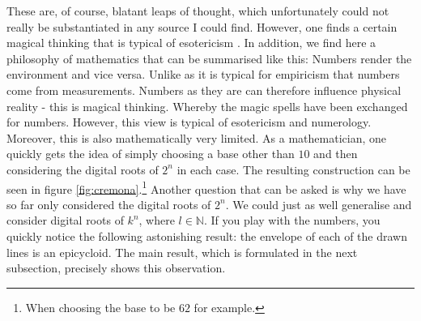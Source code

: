 \documentclass{article}
\newcommand{\N}{\mathbb{N}}
\begin{document}
These are, of course, blatant leaps of thought, which unfortunately could not really be substantiated in any source I could find. However, one finds a certain 
magical thinking that is typical of esotericism \cite{Lamberty_Nocun_2022}. In addition, we find here a philosophy of mathematics that can be summarised 
like this: Numbers render the environment and vice versa. Unlike as it is typical for empiricism that numbers come from measurements. Numbers as they are can 
therefore influence physical reality - this is magical thinking. Whereby the magic spells have been exchanged for numbers. However, this view is typical of 
esotericism and numerology. Moreover, this  is also mathematically very limited. As a mathematician, one quickly gets the idea of simply choosing 
a base other than $10$ and then considering the digital roots of $2^n$ in each case. The resulting construction can be seen in 
figure \ref{fig:cremona}.\footnote{When choosing the base to be $62$ for example.} Another question that can be asked is why we have so far only considered 
the digital roots of $2^n$. We could just as well generalise and consider digital roots of $k^n$, where $l\in\N$. If you play with the numbers, you quickly 
notice the following astonishing result: the envelope of each of the drawn lines is an epicycloid. The main result, which is formulated in the next 
subsection, precisely shows this observation.
\end{document}
